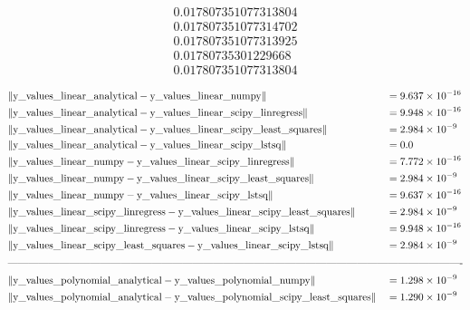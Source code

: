 \documentclass[a4paper, 14pt]{extarticle}
\begin{document}
\begin{gather*}
    0.017807351077313804 \\[0.2em]
    0.017807351077314702 \\[0.2em]
    0.017807351077313925 \\[0.2em]
    0.01780735301229668 \\[0.2em]
    0.017807351077313804 \\[0.2em]
\end{gather*}
\vspace{-50pt}
\begin{alignat*}{2}
    &\| \text{y\_values\_linear\_analytical} - \text{y\_values\_linear\_numpy} \| &&= 9.637 \times 10^{-16} \\
    &\| \text{y\_values\_linear\_analytical} - \text{y\_values\_linear\_scipy\_linregress} \| &&= 9.948 \times 10^{-16} \\
    &\| \text{y\_values\_linear\_analytical} - \text{y\_values\_linear\_scipy\_least\_squares} \| &&= 2.984 \times 10^{-9} \\
    &\| \text{y\_values\_linear\_analytical} - \text{y\_values\_linear\_scipy\_lstsq} \| &&= 0.0 \\
    &\| \text{y\_values\_linear\_numpy} - \text{y\_values\_linear\_scipy\_linregress} \| &&= 7.772 \times 10^{-16} \\
    &\| \text{y\_values\_linear\_numpy} - \text{y\_values\_linear\_scipy\_least\_squares} \| &&= 2.984 \times 10^{-9} \\
    &\| \text{y\_values\_linear\_numpy} - \text{y\_values\_linear\_scipy\_lstsq} \| &&= 9.637 \times 10^{-16} \\
    &\| \text{y\_values\_linear\_scipy\_linregress} - \text{y\_values\_linear\_scipy\_least\_squares} \| &&= 2.984 \times 10^{-9} \\
    &\| \text{y\_values\_linear\_scipy\_linregress} - \text{y\_values\_linear\_scipy\_lstsq} \| &&= 9.948 \times 10^{-16} \\
    &\| \text{y\_values\_linear\_scipy\_least\_squares} - \text{y\_values\_linear\_scipy\_lstsq} \| &&= 2.984 \times 10^{-9} \\
    \intertext{-------------------------------------------------------------------------------------------------------------------------------------}
    &\| \text{y\_values\_polynomial\_analytical} - \text{y\_values\_polynomial\_numpy} \| &&= 1.298 \times 10^{-9} \\
    &\| \text{y\_values\_polynomial\_analytical} - \text{y\_values\_polynomial\_scipy\_least\_squares} \| &&= 1.290 \times 10^{-9} \\

\end{alignat*}
\end{document}
